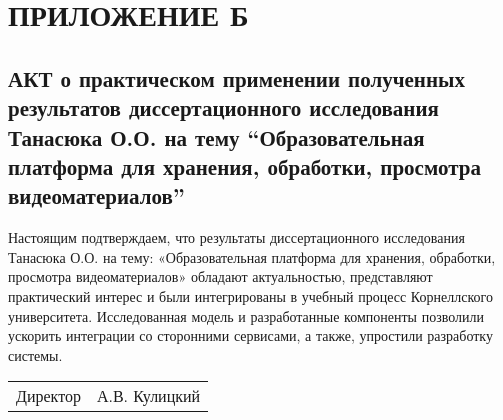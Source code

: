 \section*{ПРИЛОЖЕНИЕ Б}


\subsection*{АКТ о практическом применении полученных результатов диссертационного
исследования Танасюка О.О. на тему “Образовательная платформа для хранения,
обработки, просмотра видеоматериалов” }

\bigskip\bigskip\bigskip

Настоящим подтверждаем, что результаты диссертационного исследования Танасюка О.О.
на тему: «Образовательная платформа для хранения,
обработки, просмотра видеоматериалов» обладают актуальностью,
представляют практический интерес и были интегрированы в учебный процесс Корнеллского университета.
Исследованная модель и разработанные компоненты
позволили ускорить интеграции со сторонними сервисами, а также, упростили разработку системы.

\bigskip\bigskip\bigskip\bigskip

\begin{tabular}{ l l }

  Директор & \hspace*{8cm} А.В. Кулицкий\\
\end{tabular}